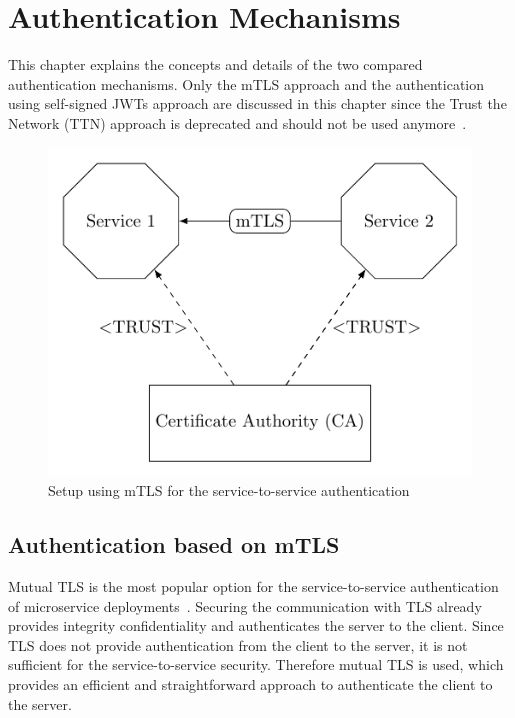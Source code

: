\chapter{Authentication Mechanisms}
\label{cha:authentication_mechanisms}
This chapter explains the concepts and details of the two compared authentication mechanisms.
Only the mTLS approach and the authentication using self-signed JWTs approach are discussed in this chapter since the Trust the Network (TTN) approach is deprecated and should not be used anymore~\cite{dias2020microservices}.

\begin{figure}
	\centering
	\includegraphics{images/authentication-mechanisms/TikZ_mTLS_base_structure.pdf}
	\caption{Setup using mTLS for the service-to-service authentication~\cite{dias2020microservices}}
	\label{fig:auth_mechanisms_mtls}
\end{figure}

\section{Authentication based on mTLS}
Mutual TLS is the most popular option for the service-to-service authentication of microservice deployments~\cite{dias2020microservices}.
Securing the communication with TLS already provides integrity confidentiality and authenticates the server to the client.
Since TLS does not provide authentication from the client to the server, it is not sufficient for the service-to-service security.
Therefore mutual TLS is used, which provides an efficient and straightforward approach to authenticate the client to the server.

